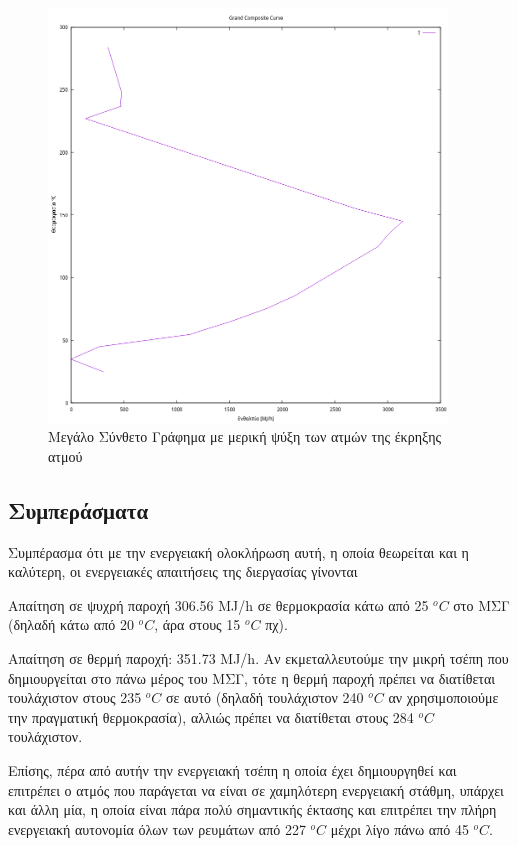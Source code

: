 \documentclass[11pt]{article}
\begin{document}
\begin{figure}[htbp]
\centering
\includegraphics[width=400px]{Diagrams/grand_composite_curve_3.png}
\caption{Μεγάλο Σύνθετο Γράφημα με μερική ψύξη των ατμών της έκρηξης ατμού}
\end{figure}

\pagebreak

\subsection{Συμπεράσματα}
\label{sec:orgfcc1b93}
Συμπέρασμα ότι με την ενεργειακή ολοκλήρωση αυτή, η οποία θεωρείται και η καλύτερη, οι ενεργειακές απαιτήσεις της διεργασίας γίνονται

Απαίτηση σε ψυχρή παροχή 306.56 MJ/h σε θερμοκρασία κάτω από 25 \(^oC\) στο ΜΣΓ (δηλαδή κάτω από 20 \(^oC\), άρα στους 15 \(^oC\) πχ).

Απαίτηση σε θερμή παροχή: 351.73 MJ/h. Αν εκμεταλλευτούμε την μικρή τσέπη που δημιουργείται στο πάνω μέρος του ΜΣΓ, τότε η θερμή παροχή πρέπει να διατίθεται τουλάχιστον στους 235 \(^oC\) σε αυτό (δηλαδή τουλάχιστον 240 \(^oC\) αν χρησιμοποιούμε την πραγματική θερμοκρασία), αλλιώς πρέπει να διατίθεται στους 284 \(^oC\) τουλάχιστον. 

Επίσης, πέρα από αυτήν την ενεργειακή τσέπη η οποία έχει δημιουργηθεί και επιτρέπει ο ατμός που παράγεται να είναι σε χαμηλότερη ενεργειακή στάθμη, υπάρχει και άλλη μία, η οποία είναι πάρα πολύ σημαντικής έκτασης και επιτρέπει την πλήρη ενεργειακή αυτονομία όλων των ρευμάτων από 227 \(^oC\) μέχρι λίγο πάνω από 45 \(^oC\).
\end{document}
